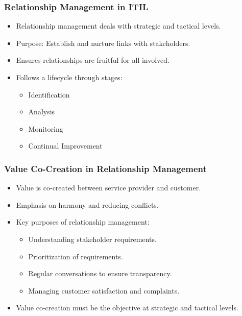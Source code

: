 \documentclass[aspectratio=169, table]{beamer}
\begin{document}
\begin{frame}
	\frametitle{Relationship Management in ITIL}
	
	\begin{itemize}
		\item Relationship management deals with strategic and tactical levels.
		\item Purpose: Establish and nurture links with stakeholders.
		\item Ensures relationships are fruitful for all involved.
		\item Follows a lifecycle through stages:
		\begin{itemize}
			\item Identification
			\item Analysis
			\item Monitoring
			\item Continual Improvement
		\end{itemize}
	\end{itemize}
	
\end{frame}

\begin{frame}
	\frametitle{Value Co-Creation in Relationship Management}
	
	\begin{itemize}
		\item Value is co-created between service provider and customer.
		\item Emphasis on harmony and reducing conflicts.
		\item Key purposes of relationship management:
		\begin{itemize}
			\item Understanding stakeholder requirements.
			\item Prioritization of requirements.
			\item Regular conversations to ensure transparency.
			\item Managing customer satisfaction and complaints.
		\end{itemize}
		\item Value co-creation must be the objective at strategic and tactical levels.
	\end{itemize}
	
\end{frame}
\end{document}
